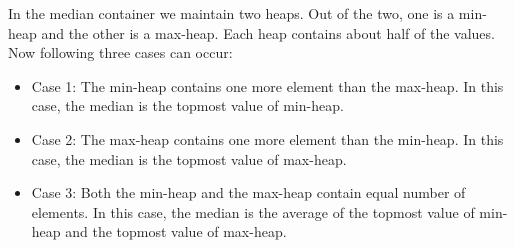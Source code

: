 In the median container we maintain two heaps. Out of the two, one is a min-heap and the other is a max-heap. Each heap contains about half of the values. Now following three cases can occur:
\begin{itemize}
\item Case 1: The min-heap contains one more element than the max-heap. In this case, the median is the topmost value of min-heap.
\item Case 2: The max-heap contains one more element than the min-heap. In this case, the median is the topmost value of max-heap.
\item Case 3: Both the min-heap and the max-heap contain equal number of elements. In this case, the median is the average of the topmost value of min-heap and the topmost value of max-heap.

\end{itemize}

